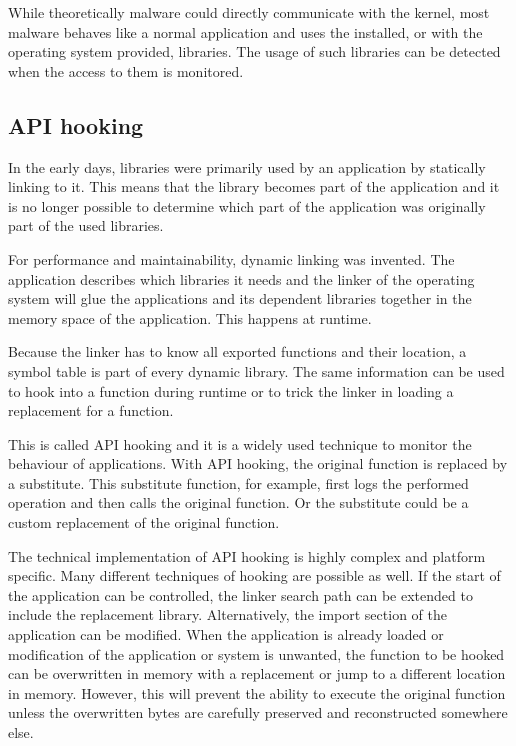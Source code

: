 While theoretically malware could directly communicate with the kernel, most malware behaves like a normal application and uses the installed, or with the operating system provided, libraries. The usage of such libraries can be detected when the access to them is monitored.

\subsection{API hooking}

In the early days, libraries were primarily used by an application by statically linking to it. This means that the library becomes part of the application and it is no longer possible to determine which part of the application was originally part of the used libraries.

For performance and maintainability, dynamic linking was invented. The application describes which libraries it needs and the linker of the operating system will glue the applications and its dependent libraries together in the memory space of the application. This happens at runtime. 

Because the linker has to know all exported functions and their location, a symbol table is part of every dynamic library. The same information can be used to hook into a function during runtime or to trick the linker in loading a replacement for a function.

This is called API hooking\cite{wikihooking} and it is a widely used technique to monitor the behaviour of applications. With API hooking, the original function is replaced by a substitute. This substitute function, for example, first logs the performed operation and then calls the original function. Or the substitute could be a custom replacement of the original function.

The technical implementation of API hooking is highly complex and platform specific. Many different techniques\cite{jbremer2012} of hooking are possible as well. If the start of the application can be controlled, the linker search path can be extended to include the replacement library. Alternatively, the import section of the application can be modified. When the application is already loaded or modification of the application or system is unwanted, the function to be hooked can be overwritten in memory with a replacement or jump to a different location in memory. However, this will prevent the ability to execute the original function unless the overwritten bytes are carefully preserved and reconstructed somewhere else.

